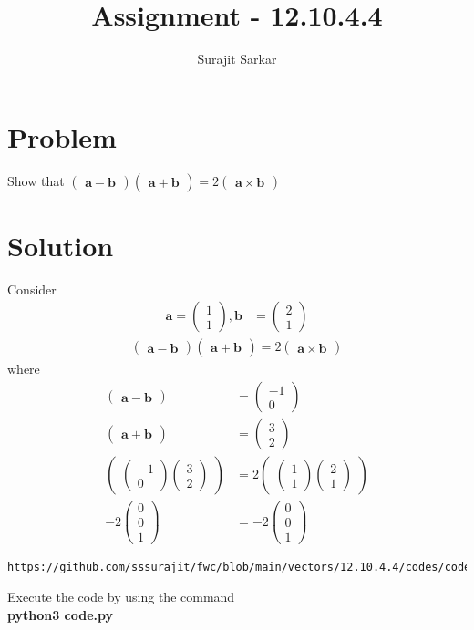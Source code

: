 \documentclass[journal,12pt,twocolumn]{IEEEtran}
\title{\mytitle}
\title{
Assignment - 12.10.4.4
}
\author{Surajit Sarkar}
\newcommand{\myvec}[1]{\ensuremath{\begin{pmatrix}#1\end{pmatrix}}}
\let\vec\mathbf
\begin{document}
\maketitle
\tableofcontents
\bigskip
\section{\textbf{Problem}}
Show that $\myvec{\vec{a}-\vec{b}}\myvec{\vec{a}+\vec{b}}=2\myvec{\vec{a}\times\vec{b}}$
\section{\textbf{Solution}}
Consider
\begin{align}
\vec{a}=\myvec{1\\1},\vec{b}&=\myvec{2\\1}
\end{align}
\begin{align}
  \myvec{\vec{a}-\vec{b}}\myvec{\vec{a}+\vec{b}}=2\myvec{\vec{a}\times\vec{b}}
  \end{align}
  where
  \begin{align}
  \myvec{\vec{a}-\vec{b}}&=\myvec{-1\\0}\\
  \myvec{\vec{a}+\vec{b}}&=\myvec{3\\2}\\
  \myvec{\myvec{-1\\0}\myvec{3\\2}}&=2\myvec{\myvec{1\\1}\myvec{2\\1}}\\
  -2\myvec{0\\0\\1}&=-2\myvec{0\\0\\1}
  \end{align}
\begin{lstlisting}
https://github.com/sssurajit/fwc/blob/main/vectors/12.10.4.4/codes/code.py
\end{lstlisting}
Execute the code by using the command\\
\textbf{python3 code.py}
\end{document}
